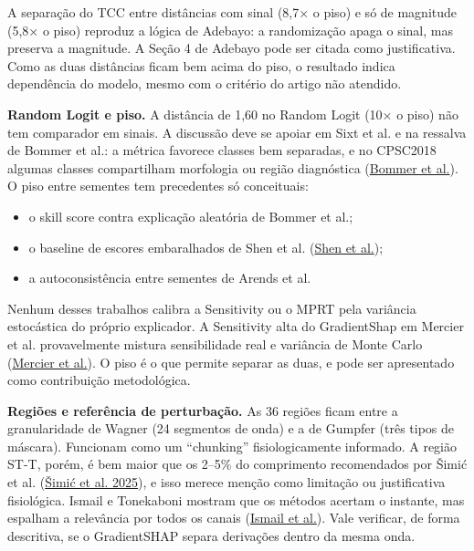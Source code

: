 \documentclass[11pt,a4paper]{article}
\begin{document}
A separação do TCC entre distâncias com sinal (8,7× o piso) e só de magnitude (5,8× o piso) reproduz a lógica de Adebayo: a randomização apaga o sinal, mas preserva a magnitude. A Seção 4 de Adebayo pode ser citada como justificativa. Como as duas distâncias ficam bem acima do piso, o resultado indica dependência do modelo, mesmo com o critério do artigo não atendido.

\textbf{Random Logit e piso.} A distância de 1,60 no Random Logit (10× o piso) não tem comparador em sinais. A discussão deve se apoiar em Sixt et al. e na ressalva de Bommer et al.: a métrica favorece classes bem separadas, e no CPSC2018 algumas classes compartilham morfologia ou região diagnóstica (\href{https://arxiv.org/abs/2303.00652}{Bommer et al.}). O piso entre sementes tem precedentes só conceituais:

\begin{itemize}
\item o skill score contra explicação aleatória de Bommer et al.;
\item o baseline de escores embaralhados de Shen et al. (\href{https://arxiv.org/abs/2505.16406}{Shen et al.});
\item a autoconsistência entre sementes de Arends et al.
\end{itemize}

Nenhum desses trabalhos calibra a Sensitivity ou o MPRT pela variância estocástica do próprio explicador. A Sensitivity alta do GradientShap em Mercier et al. provavelmente mistura sensibilidade real e variância de Monte Carlo (\href{https://arxiv.org/abs/2202.03759}{Mercier et al.}). O piso é o que permite separar as duas, e pode ser apresentado como contribuição metodológica.

\textbf{Regiões e referência de perturbação.} As 36 regiões ficam entre a granularidade de Wagner (24 segmentos de onda) e a de Gumpfer (três tipos de máscara). Funcionam como um ``chunking'' fisiologicamente informado. A região ST-T, porém, é bem maior que os 2–5\% do comprimento recomendados por Šimić et al. (\href{https://pmc.ncbi.nlm.nih.gov/articles/PMC12284047/}{Šimić et al. 2025}), e isso merece menção como limitação ou justificativa fisiológica. Ismail e Tonekaboni mostram que os métodos acertam o instante, mas espalham a relevância por todos os canais (\href{https://arxiv.org/abs/2010.13924}{Ismail et al.}). Vale verificar, de forma descritiva, se o GradientSHAP separa derivações dentro da mesma onda.
\end{document}
